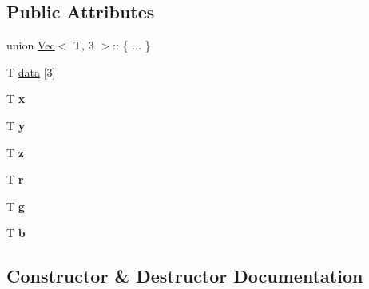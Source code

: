 \subsection*{Public Attributes}
\begin{DoxyCompactItemize}
\item 
\hypertarget{structVec_3_01T_00_013_01_4_a090a6e6d6471482a33d4f5b66548c9e5}{}union \hyperlink{structVec}{Vec}$<$ T, 3 $>$\+:: \{ ... \}  \label{structVec_3_01T_00_013_01_4_a090a6e6d6471482a33d4f5b66548c9e5}

\item 
T \hyperlink{structVec_3_01T_00_013_01_4_a07af69736eca9e1115b69d51fac21514}{data} \mbox{[}3\mbox{]}
\item 
\hypertarget{structVec_3_01T_00_013_01_4_ac73cf62d6ee2d6f72a40a6d30677e2c5}{}T {\bfseries x}\label{structVec_3_01T_00_013_01_4_ac73cf62d6ee2d6f72a40a6d30677e2c5}

\item 
\hypertarget{structVec_3_01T_00_013_01_4_a518370197670c87da6f100853dd1ebe7}{}T {\bfseries y}\label{structVec_3_01T_00_013_01_4_a518370197670c87da6f100853dd1ebe7}

\item 
\hypertarget{structVec_3_01T_00_013_01_4_a380f1acf13bb3e1d570bf3396aa32bb0}{}T {\bfseries z}\label{structVec_3_01T_00_013_01_4_a380f1acf13bb3e1d570bf3396aa32bb0}

\item 
\hypertarget{structVec_3_01T_00_013_01_4_acb3dc926a0256dda915039cdb213596e}{}T {\bfseries r}\label{structVec_3_01T_00_013_01_4_acb3dc926a0256dda915039cdb213596e}

\item 
\hypertarget{structVec_3_01T_00_013_01_4_ab6e2b4d396af0d9cc561b3d4f684dd2c}{}T {\bfseries g}\label{structVec_3_01T_00_013_01_4_ab6e2b4d396af0d9cc561b3d4f684dd2c}

\item 
\hypertarget{structVec_3_01T_00_013_01_4_a5828f123a95e1eeef713612137196a42}{}T {\bfseries b}\label{structVec_3_01T_00_013_01_4_a5828f123a95e1eeef713612137196a42}

\end{DoxyCompactItemize}


\subsection{Constructor \& Destructor Documentation}
\hypertarget{structVec_3_01T_00_013_01_4_a5b7405b3d5de4da6f3ae64a34ded20f2}{}
